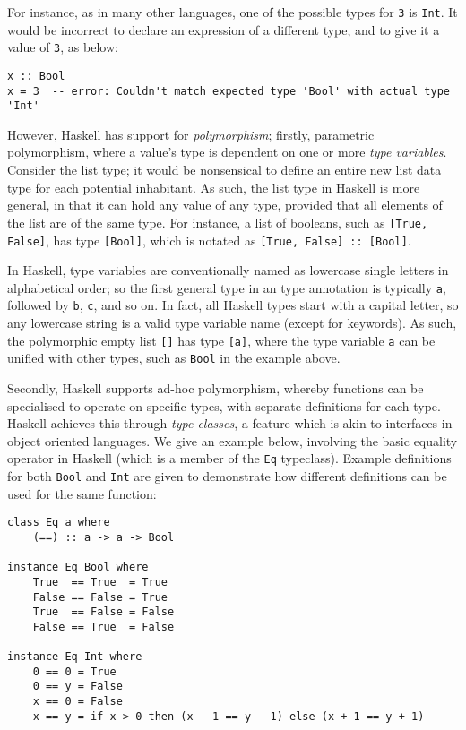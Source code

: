 \documentclass[12pt, a4paper, bibliography=totocnumbered]{scrreprt}
\newcommand{\inline}[1]{\lstinline[basicstyle=\ttfamily\footnotesize]{#1}}
\begin{document}
For instance, as in many other languages, one of the possible types for \inline{3} is \inline{Int}. It would be incorrect to declare an expression of a different type, and to give it a value of \inline{3}, as below:

\begin{lstlisting}
x :: Bool
x = 3  -- error: Couldn't match expected type 'Bool' with actual type 'Int'
\end{lstlisting}

However, Haskell has support for \emph{polymorphism}; firstly, parametric polymorphism, where a value's type is dependent on one or more \emph{type variables}. Consider the list type; it would be nonsensical to define an entire new list data type for each potential inhabitant. As such, the list type in Haskell is more general, in that it can hold any value of any type, provided that all elements of the list are of the same type. For instance, a list of booleans, such as \inline{[True, False]}, has type \inline{[Bool]}, which is notated as \inline{[True, False] :: [Bool]}.

In Haskell, type variables are conventionally named as lowercase single letters in alphabetical order; so the first general type in an type annotation is typically \inline{a}, followed by \inline{b}, \inline{c}, and so on. In fact, all Haskell types start with a capital letter, so any lowercase string is a valid type variable name (except for keywords). As such, the polymorphic empty list \inline{[]} has type \inline{[a]}, where the type variable \inline{a} can be unified with other types, such as \inline{Bool} in the example above.

Secondly, Haskell supports ad-hoc polymorphism, whereby functions can be specialised to operate on specific types, with separate definitions for each type. Haskell achieves this through \emph{type classes}, a feature which is akin to interfaces in object oriented languages. We give an example below, involving the basic equality operator in Haskell (which is a member of the \inline{Eq} typeclass). Example definitions for both \inline{Bool} and \inline{Int} are given to demonstrate how different definitions can be used for the same function:

\begin{lstlisting}
class Eq a where
    (==) :: a -> a -> Bool

instance Eq Bool where
    True  == True  = True
    False == False = True
    True  == False = False
    False == True  = False

instance Eq Int where
    0 == 0 = True
    0 == y = False
    x == 0 = False
    x == y = if x > 0 then (x - 1 == y - 1) else (x + 1 == y + 1)
\end{lstlisting}
\end{document}
